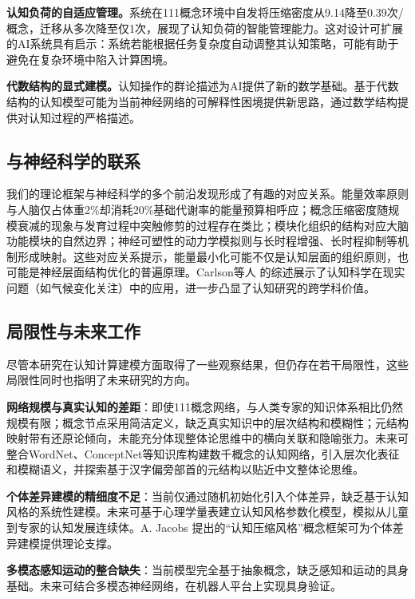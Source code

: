 \documentclass[12pt,a4paper]{article}
\begin{document}
\textbf{认知负荷的自适应管理。}系统在111概念环境中自发将压缩密度从9.14降至0.39次/概念，迁移从多次降至仅1次，展现了认知负荷的智能管理能力。这对设计可扩展的AI系统具有启示：系统若能根据任务复杂度自动调整其认知策略，可能有助于避免在复杂环境中陷入计算困境。

\textbf{代数结构的显式建模。}认知操作的群论描述为AI提供了新的数学基础。基于代数结构的认知模型可能为当前神经网络的可解释性困境提供新思路，通过数学结构提供对认知过程的严格描述。

\subsection{与神经科学的联系}

我们的理论框架与神经科学的多个前沿发现形成了有趣的对应关系。能量效率原则与人脑仅占体重2\%却消耗20\%基础代谢率的能量预算相呼应；概念压缩密度随规模衰减的现象与发育过程中突触修剪的过程存在类比；模块化组织的结构对应大脑功能模块的自然边界；神经可塑性的动力学模拟则与长时程增强、长时程抑制等机制形成映射。这些对应关系提示，能量最小化可能不仅是认知层面的组织原则，也可能是神经层面结构优化的普遍原理。Carlson等人 \cite{carlson2025attending} 的综述展示了认知科学在现实问题（如气候变化关注）中的应用，进一步凸显了认知研究的跨学科价值。

\subsection{局限性与未来工作}

尽管本研究在认知计算建模方面取得了一些观察结果，但仍存在若干局限性，这些局限性同时也指明了未来研究的方向。

\textbf{网络规模与真实认知的差距}：即使111概念网络，与人类专家的知识体系相比仍然规模有限；概念节点采用简洁定义，缺乏真实知识中的层次结构和模糊性；元结构映射带有还原论倾向，未能充分体现整体论思维中的横向关联和隐喻张力。未来可整合WordNet、ConceptNet等知识库构建数千概念的认知网络，引入层次化表征和模糊语义，并探索基于汉字偏旁部首的元结构以贴近中文整体论思维。

\textbf{个体差异建模的精细度不足}：当前仅通过随机初始化引入个体差异，缺乏基于认知风格的系统性建模。未来可基于心理学量表建立认知风格参数化模型，模拟从儿童到专家的认知发展连续体。A. Jacobs \cite{jacobs2026cognitive} 提出的“认知压缩风格”概念框架可为个体差异建模提供理论支撑。

\textbf{多模态感知运动的整合缺失}：当前模型完全基于抽象概念，缺乏感知和运动的具身基础。未来可结合多模态神经网络，在机器人平台上实现具身验证。
\end{document}
